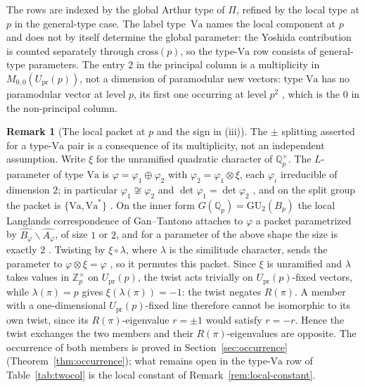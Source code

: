 \documentclass[11pt]{amsart}
\theoremstyle{plain}
\theoremstyle{definition}
\newtheorem{remark}[theorem]{Remark}
\newcommand{\Q}{\mathbb{Q}}
\newcommand{\Z}{\mathbb{Z}}
\newcommand{\GU}{\mathrm{GU}}
\newcommand{\Upr}{U_{\mathrm{pr}}}
\newcommand{\Va}{\mathrm{Va}}
\providecommand{\Upr}{U_{\mathrm{pr}}}
\providecommand{\Va}{\mathrm{Va}}
\begin{document}
	The rows are indexed by the global Arthur type of $\Pi$, refined by the
	local type at $p$ in the general-type case. The label type~$\Va$ names the
	local component at $p$ and does not by itself determine the global
	parameter: the Yoshida contribution is counted separately through
	$\mathrm{cross}(p)$, so the type-$\Va$ row consists of general-type
	parameters. The entry $2$ in the principal column is a multiplicity in
	$M_{0,0}(\Upr(p))$, not a dimension of paramodular new vectors: type
	$\Va$ has no paramodular vector at level $p$, its first one occurring at
	level $p^{2}$ \cite[Table~5.2]{RobertsSchmidtTables}, which is the $0$ in
	the non-principal column.
	
	\begin{remark}[The local packet at $p$ and the sign in
		\textup{(iii)}]
		\label{rem:localpacket}
		The $\pm$ splitting asserted for a type-$\Va$ pair is a consequence of
		its multiplicity, not an independent assumption. Write $\xi$ for the
		unramified quadratic character of $\Q_p^\times$. The $L$-parameter of
		type $\Va$ is $\varphi=\varphi_1\oplus\varphi_2$ with
		$\varphi_2=\varphi_1\otimes\xi$, each $\varphi_i$ irreducible of
		dimension $2$; in particular $\varphi_1\not\cong\varphi_2$ and
		$\det\varphi_1=\det\varphi_2$
		\cite[Tables~3.1--3.2]{RobertsSchmidtTables}, and on the split group the
		packet is $\{\Va,\Va^{*}\}$ \cite[\S3]{Schmidt2018}. On the inner form
		$G(\Q_p)=\GU_2(B_p)$ the local Langlands correspondence of
		Gan--Tantono attaches to $\varphi$ a packet parametrized by
		$\widehat{B_\varphi}\smallsetminus\widehat{A_\varphi}$, of size $1$ or
		$2$, and for a parameter of the above shape the size is exactly $2$
		\cite[Main Thm.~(ii), \S7.2]{GanTantono}. Twisting by $\xi\circ\lambda$,
		where $\lambda$ is the similitude character, sends the parameter to
		$\varphi\otimes\xi=\varphi$
		\cite[Main Thm.~(iv)]{GanTantono}, so it permutes this packet. Since
		$\xi$ is unramified and $\lambda$ takes values in $\Z_p^\times$ on
		$\Upr(p)$, the twist acts trivially on $\Upr(p)$-fixed vectors, while
		$\lambda(\pi)=p$ gives $\xi(\lambda(\pi))=-1$: the twist negates
		$R(\pi)$. A member with a one-dimensional $\Upr(p)$-fixed line therefore
		cannot be isomorphic to its own twist, since its $R(\pi)$-eigenvalue
		$r=\pm1$ would satisfy $r=-r$. Hence the twist exchanges the two members
		and their $R(\pi)$-eigenvalues are opposite. The occurrence of both members is proved in
		Section~\ref{sec:occurrence} (Theorem~\ref{thm:occurrence}); what
		remains open in the type-$\Va$ row of Table~\ref{tab:twocol} is the
		local constant of Remark~\ref{rem:local-constant}.
	\end{remark}
	
\end{document}
